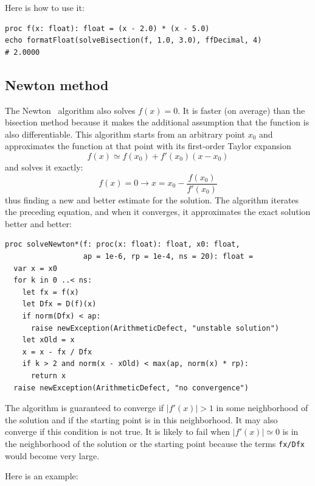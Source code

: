 \documentclass[justified, sixbynine]{tufte-book}
\def\ft{\small\tt}
\theoremstyle{plain}%
\newtheorem * {corollary}{Corollary}
\theoremstyle{definition}
\theoremstyle{remark}
\newtheorem * {remark}{Remark}
\newtheorem * {note}{Note}
\begin{document}
\begin{fullwidth}
Here is how to use it:

\begin{lstlisting}
proc f(x: float): float = (x - 2.0) * (x - 5.0)
echo formatFloat(solveBisection(f, 1.0, 3.0), ffDecimal, 4)
# 2.0000
\end{lstlisting}

\goodbreak\subsection{Newton method}


The Newton~\cite{newton} algorithm also solves $f(x)=0$. It is faster (on average) than the bisection method because it makes the additional assumption that the function is also differentiable. This algorithm starts from an arbitrary point $x_0$ and approximates the function at that point with its first-order Taylor expansion
\begin{equation}
f(x) \simeq f(x_0) + f'(x_0)(x-x_0)
\end{equation}
and solves it exactly:
\begin{equation}
f(x) = 0 \rightarrow x = x_0 - \frac{f(x_0)}{f'(x_0)}
\end{equation}
thus finding a new and better estimate for the solution. The algorithm iterates the preceding equation, and when it converges, it approximates the exact solution better and better:

\begin{lstlisting}[caption={in file: {\ft nlib/solvers.nim}}]
proc solveNewton*(f: proc(x: float): float, x0: float,
                  ap = 1e-6, rp = 1e-4, ns = 20): float =
  var x = x0
  for k in 0 ..< ns:
    let fx = f(x)
    let Dfx = D(f)(x)
    if norm(Dfx) < ap:
      raise newException(ArithmeticDefect, "unstable solution")
    let xOld = x
    x = x - fx / Dfx
    if k > 2 and norm(x - xOld) < max(ap, norm(x) * rp):
      return x
  raise newException(ArithmeticDefect, "no convergence")
\end{lstlisting}

The algorithm is guaranteed to converge if $|f'(x)|>1$ in some neighborhood of the solution and if the starting point is in this neighborhood. It may also converge if this condition is not true. It is likely to fail when $|f'(x)|\simeq 0$ is in the neighborhood of the solution or the starting point because the terms {\ft fx/Dfx} would become very large.

Here is an example:


\end{fullwidth}
\end{document}
